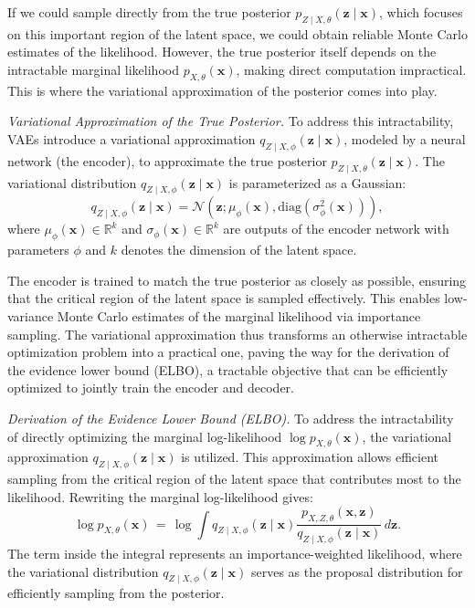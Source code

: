 If we could sample directly from the true posterior \(p_{Z \mid X, \theta}(\mathbf{z} \mid \mathbf{x})\), which focuses on this important region of the latent space, we could obtain reliable Monte Carlo estimates of the likelihood. However, the true posterior itself depends on the intractable marginal likelihood \(p_{X, \theta}(\mathbf{x})\), making direct computation impractical. This is where the variational approximation of the posterior comes into play.

\textit{Variational Approximation of the True Posterior.} To address this intractability, VAEs introduce a variational approximation \(q_{Z \mid X, \phi}(\mathbf{z} \mid \mathbf{x})\), modeled by a neural network (the encoder), to approximate the true posterior \(p_{Z \mid X, \theta}(\mathbf{z} \mid \mathbf{x})\). The variational distribution \(q_{Z \mid X, \phi}(\mathbf{z} \mid \mathbf{x})\) is parameterized as a Gaussian:
\[
q_{Z \mid X, \phi}(\mathbf{z} \mid \mathbf{x}) = \mathcal{N}(\mathbf{z}; \mu_\phi(\mathbf{x}), \mathrm{diag}(\sigma_\phi^2(\mathbf{x}))),
\]
where \(\mu_\phi(\mathbf{x}) \in \mathbb{R}^k\) and \(\sigma_\phi(\mathbf{x}) \in \mathbb{R}^k\) are outputs of the encoder network with parameters \(\phi\) and $k$ denotes the dimension of the latent space.

The encoder is trained to match the true posterior as closely as possible, ensuring that the critical region of the latent space is sampled effectively. This enables low-variance Monte Carlo estimates of the marginal likelihood via importance sampling. The variational approximation thus transforms an otherwise intractable optimization problem into a practical one, paving the way for the derivation of the evidence lower bound (ELBO), a tractable objective that can be efficiently optimized to jointly train the encoder and decoder.

\textit{Derivation of the Evidence Lower Bound (ELBO).} To address the intractability of directly optimizing the marginal log-likelihood \(\log p_{X,\theta}(\mathbf{x})\), the variational approximation \(q_{Z\mid X,\phi}(\mathbf{z} \mid \mathbf{x})\) is utilized. This approximation allows efficient sampling from the critical region of the latent space that contributes most to the likelihood. Rewriting the marginal log-likelihood gives:
\[
\log p_{X,\theta}(\mathbf{x}) 
\,=\,
\log 
\int 
q_{Z \mid X,\phi}(\mathbf{z} \mid \mathbf{x}) 
\frac{p_{X,Z,\theta}(\mathbf{x}, \mathbf{z})}{q_{Z \mid X,\phi}(\mathbf{z} \mid \mathbf{x})}
\, d\mathbf{z}.
\]
The term inside the integral represents an importance-weighted likelihood, where the variational distribution \(q_{Z \mid X,\phi}(\mathbf{z} \mid \mathbf{x})\) serves as the proposal distribution for efficiently sampling from the posterior. 

